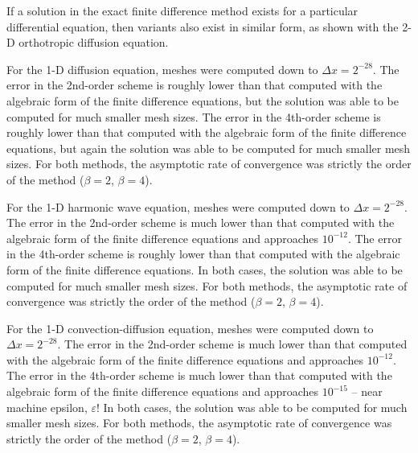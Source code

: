 \documentclass[10pt]{article}		%
\numberwithin{equation}{section}
\begin{document}
\vspace{10 pt}

If a solution in the exact finite difference method exists for a particular differential equation, then variants also exist in similar form, as shown with the 2-D orthotropic diffusion equation.

\vspace{10 pt}

For the 1-D diffusion equation, meshes were computed down to $\Delta x = 2^{-28}$. The error in the 2nd-order scheme is roughly lower than that computed with the algebraic form of the finite difference equations, but the solution was able to be computed for much smaller mesh sizes. The error in the 4th-order scheme is roughly lower than that computed with the algebraic form of the finite difference equations, but again the solution was able to be computed for much smaller mesh sizes. For both methods, the asymptotic rate of convergence was strictly the order of the method ($\beta = 2$, $\beta = 4$).

\vspace{10 pt}

For the 1-D harmonic wave equation, meshes were computed down to $\Delta x = 2^{-28}$. The error in the 2nd-order scheme is much lower than that computed with the algebraic form of the finite difference equations and approaches $10^{-12}$. The error in the 4th-order scheme is roughly lower than that computed with the algebraic form of the finite difference equations. In both cases, the solution was able to be computed for much smaller mesh sizes. For both methods, the asymptotic rate of convergence was strictly the order of the method ($\beta = 2$, $\beta = 4$).

\vspace{10 pt}

For the 1-D convection-diffusion equation, meshes were computed down to $\Delta x = 2^{-28}$. The error in the 2nd-order scheme is much lower than that computed with the algebraic form of the finite difference equations and approaches $10^{-12}$. The error in the 4th-order scheme is much lower than that computed with the algebraic form of the finite difference equations and approaches $10^{-15}$ -- near machine epsilon, $\varepsilon$! In both cases, the solution was able to be computed for much smaller mesh sizes. For both methods, the asymptotic rate of convergence was strictly the order of the method ($\beta = 2$, $\beta = 4$).

\vspace{10 pt}
\end{document}
